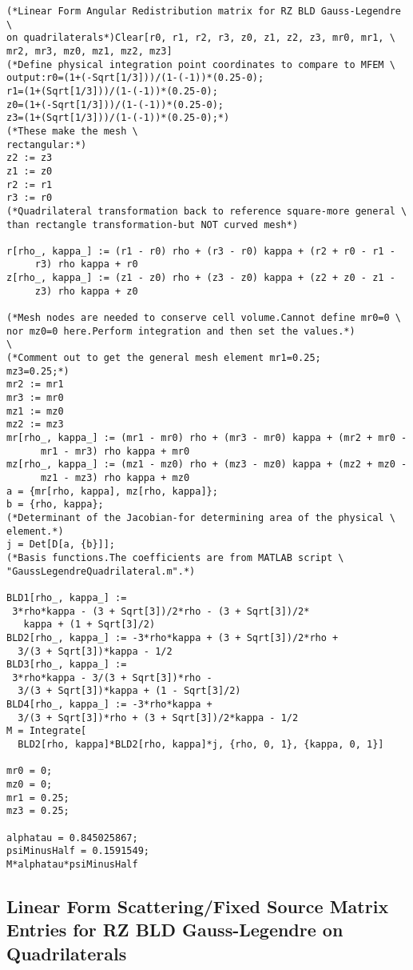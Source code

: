 \documentclass{article}
\begin{document}
\begin{verbatim}
(*Linear Form Angular Redistribution matrix for RZ BLD Gauss-Legendre \
on quadrilaterals*)Clear[r0, r1, r2, r3, z0, z1, z2, z3, mr0, mr1, \
mr2, mr3, mz0, mz1, mz2, mz3]
(*Define physical integration point coordinates to compare to MFEM \
output:r0=(1+(-Sqrt[1/3]))/(1-(-1))*(0.25-0);
r1=(1+(Sqrt[1/3]))/(1-(-1))*(0.25-0);
z0=(1+(-Sqrt[1/3]))/(1-(-1))*(0.25-0);
z3=(1+(Sqrt[1/3]))/(1-(-1))*(0.25-0);*)
(*These make the mesh \
rectangular:*)
z2 := z3
z1 := z0
r2 := r1
r3 := r0
(*Quadrilateral transformation back to reference square-more general \
than rectangle transformation-but NOT curved mesh*)

r[rho_, kappa_] := (r1 - r0) rho + (r3 - r0) kappa + (r2 + r0 - r1 - 
     r3) rho kappa + r0
z[rho_, kappa_] := (z1 - z0) rho + (z3 - z0) kappa + (z2 + z0 - z1 - 
     z3) rho kappa + z0

(*Mesh nodes are needed to conserve cell volume.Cannot define mr0=0 \
nor mz0=0 here.Perform integration and then set the values.*)
\
(*Comment out to get the general mesh element mr1=0.25;
mz3=0.25;*)
mr2 := mr1
mr3 := mr0
mz1 := mz0
mz2 := mz3
mr[rho_, kappa_] := (mr1 - mr0) rho + (mr3 - mr0) kappa + (mr2 + mr0 -
      mr1 - mr3) rho kappa + mr0
mz[rho_, kappa_] := (mz1 - mz0) rho + (mz3 - mz0) kappa + (mz2 + mz0 -
      mz1 - mz3) rho kappa + mz0
a = {mr[rho, kappa], mz[rho, kappa]};
b = {rho, kappa};
(*Determinant of the Jacobian-for determining area of the physical \
element.*)
j = Det[D[a, {b}]];
(*Basis functions.The coefficients are from MATLAB script \
"GaussLegendreQuadrilateral.m".*)

BLD1[rho_, kappa_] := 
 3*rho*kappa - (3 + Sqrt[3])/2*rho - (3 + Sqrt[3])/2*
   kappa + (1 + Sqrt[3]/2)
BLD2[rho_, kappa_] := -3*rho*kappa + (3 + Sqrt[3])/2*rho + 
  3/(3 + Sqrt[3])*kappa - 1/2
BLD3[rho_, kappa_] := 
 3*rho*kappa - 3/(3 + Sqrt[3])*rho - 
  3/(3 + Sqrt[3])*kappa + (1 - Sqrt[3]/2)
BLD4[rho_, kappa_] := -3*rho*kappa + 
  3/(3 + Sqrt[3])*rho + (3 + Sqrt[3])/2*kappa - 1/2
M = Integrate[
  BLD2[rho, kappa]*BLD2[rho, kappa]*j, {rho, 0, 1}, {kappa, 0, 1}]

mr0 = 0;
mz0 = 0;
mr1 = 0.25;
mz3 = 0.25;

alphatau = 0.845025867;
psiMinusHalf = 0.1591549;
M*alphatau*psiMinusHalf
\end{verbatim}

\subsection{Linear Form Scattering/Fixed Source Matrix Entries for RZ BLD Gauss-Legendre on Quadrilaterals}
\end{document}
